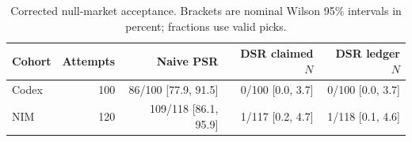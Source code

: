 \begin{table}[tbp]
\centering\small
\setlength{\tabcolsep}{4pt}
\caption{Corrected null-market acceptance. Brackets are nominal Wilson 95\% intervals in percent; fractions use valid picks.}\label{tab:cohorts}
\begin{tabular}{lrrrr}
\toprule
Cohort & Attempts & Naive PSR & DSR claimed $N$ & DSR ledger $N$ \\
\midrule
Codex & 100 & 86/100 [77.9, 91.5] & 0/100 [0.0, 3.7] & 0/100 [0.0, 3.7] \\
NIM & 120 & 109/118 [86.1, 95.9] & 1/117 [0.2, 4.7] & 1/118 [0.1, 4.6] \\
\bottomrule
\end{tabular}
\end{table}
